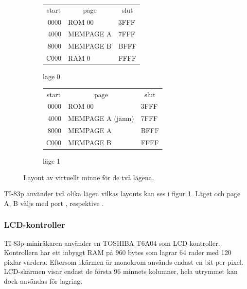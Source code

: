 \documentclass[main.tex]{subfiles}
\begin{document}
\begin{figure}[b]
    \begin{subfigure}{0.5\textwidth}
        \center
        \ttfamily
        \begin{tabular}{r|m{3.5cm}|l}
            \multicolumn{1}{c}{\normalfont start} &
            \multicolumn{1}{c}{\normalfont page} &
            \multicolumn{1}{c}{\normalfont slut} \\ \cline{2-2}
            0000 & ROM 00    & 3FFF \\ \cline{2-2}
            4000 & MEMPAGE A & 7FFF \\ \cline{2-2}
            8000 & MEMPAGE B & BFFF \\ \cline{2-2}
            C000 & RAM 0     & FFFF \\ \cline{2-2}
        \end{tabular}
        \caption{läge 0}
    \end{subfigure}
    \begin{subfigure}{0.5\textwidth}
        \center
        \ttfamily
        \begin{tabular}{r|m{3.5cm}|l}
            \multicolumn{1}{c}{\normalfont start} &
            \multicolumn{1}{c}{\normalfont page} &
            \multicolumn{1}{c}{\normalfont slut} \\ \cline{2-2}
            0000 & ROM 00           & 3FFF \\ \cline{2-2}
            4000 & MEMPAGE A (jämn) & 7FFF \\ \cline{2-2}
            8000 & MEMPAGE A        & BFFF \\ \cline{2-2}
            C000 & MEMPAGE B        & FFFF \\ \cline{2-2}
        \end{tabular}
        \caption{läge 1}
    \end{subfigure}
    \caption{Layout av virtuellt minne för de två lägena.}
    \label{fig:virtual}
\end{figure}

TI-83p använder två olika lägen vilkas layouts kan ses i figur
\ref{fig:virtual}. Läget och page A, B väljs med port , 
respektive . \cite{wikiti-mmap}

\subsubsection{LCD-kontroller}
TI-83p-miniräkaren använder en TOSHIBA T6A04 som LCD-kontroller. Kontrollern
har ett inbyggt RAM på 960 bytes som lagrar 64 rader med 120 pixlar vardera.
Eftersom skärmen är monokrom används endast en bit per pixel. LCD-skärmen visar
endast de första 96 minnets kolumner, hela utrymmet kan dock användas för
lagring.
\end{document}
